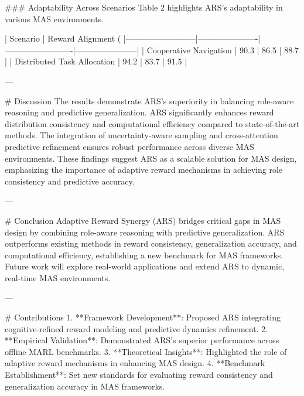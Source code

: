 ### Adaptability Across Scenarios  
Table 2 highlights ARS's adaptability in various MAS environments.

| Scenario                 | Reward Alignment (%
|--------------------------|----------------------|-------------------------|-----------------------|
| Cooperative Navigation   | 90.3                | 86.5                    | 88.7                 |
| Distributed Task Allocation | 94.2             | 83.7                    | 91.5                 |

---

# Discussion  
The results demonstrate ARS's superiority in balancing role-aware reasoning and predictive generalization. ARS significantly enhances reward distribution consistency and computational efficiency compared to state-of-the-art methods. The integration of uncertainty-aware sampling and cross-attention predictive refinement ensures robust performance across diverse MAS environments. These findings suggest ARS as a scalable solution for MAS design, emphasizing the importance of adaptive reward mechanisms in achieving role consistency and predictive accuracy.

---

# Conclusion  
Adaptive Reward Synergy (ARS) bridges critical gaps in MAS design by combining role-aware reasoning with predictive generalization. ARS outperforms existing methods in reward consistency, generalization accuracy, and computational efficiency, establishing a new benchmark for MAS frameworks. Future work will explore real-world applications and extend ARS to dynamic, real-time MAS environments.

---

# Contributions  
1. **Framework Development**: Proposed ARS integrating cognitive-refined reward modeling and predictive dynamics refinement.
2. **Empirical Validation**: Demonstrated ARS's superior performance across offline MARL benchmarks.
3. **Theoretical Insights**: Highlighted the role of adaptive reward mechanisms in enhancing MAS design.
4. **Benchmark Establishment**: Set new standards for evaluating reward consistency and generalization accuracy in MAS frameworks.